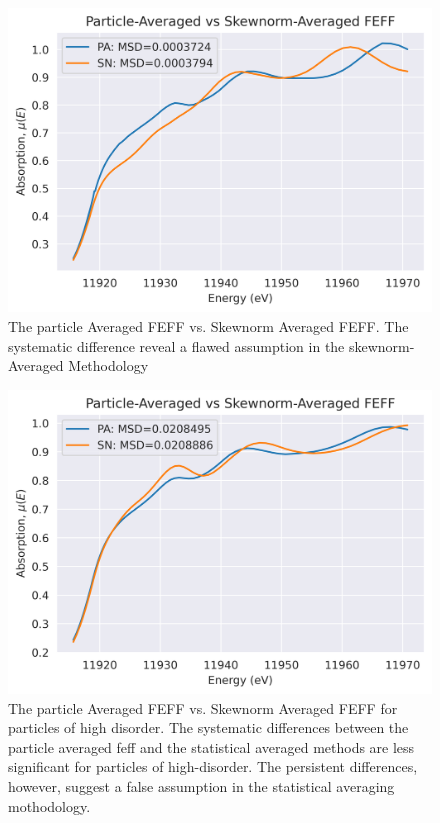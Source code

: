 \begin{figure}[!h]
	\centering
	\label{fig:pa-vs-sknm-feff}
	\includegraphics[width=.75\linewidth]{Chapters/Figures/PA-vs-skewnorm-newvals.png}
	\caption[Particle-Averaged vs. Skewnorm-Averaged FEFF Low-Disorder]{The particle Averaged FEFF vs. Skewnorm Averaged FEFF. The systematic difference reveal a flawed assumption in the skewnorm-Averaged Methodology}
\end{figure}

\begin{figure}[!h]
	\centering
	\label{fig:pa-vs-sknm-feff-bigmsd}
	\includegraphics[width=.75\linewidth]{Chapters/Figures/PA-vs-skewnorm-newvals-large-msd.png}
	\caption[Particle-Averaged vs. Skewnorm-Averaged FEFF High-Disorder]{The particle Averaged FEFF vs. Skewnorm Averaged FEFF for particles of high disorder. The systematic differences between the particle averaged feff and the statistical averaged methods are less significant for particles of high-disorder. The persistent differences, however, suggest a false assumption in the statistical averaging mothodology.}
\end{figure}

